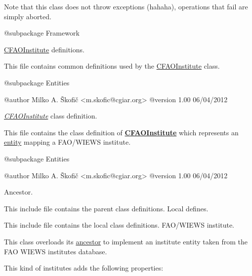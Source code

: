 Note that this class does not throw exceptions (hahaha), operations that fail are simply aborted.

\begin{DoxyVerb}    @subpackage     Framework\end{DoxyVerb}


\hyperlink{class_c_f_a_o_institute}{C\-F\-A\-O\-Institute} definitions.

This file contains common definitions used by the \hyperlink{class_c_f_a_o_institute}{C\-F\-A\-O\-Institute} class.

\begin{DoxyVerb}    @subpackage     Entities

    @author         Milko A. Škofič <m.skofic@cgiar.org>
    @version        1.00 06/04/2012\end{DoxyVerb}


{\itshape \hyperlink{class_c_f_a_o_institute}{C\-F\-A\-O\-Institute}} class definition.

This file contains the class definition of {\bfseries \hyperlink{class_c_f_a_o_institute}{C\-F\-A\-O\-Institute}} which represents an \hyperlink{class_c_entity}{entity} mapping a F\-A\-O/\-W\-I\-E\-W\-S institute.

\begin{DoxyVerb}    @subpackage     Entities

    @author         Milko A. Škofič <m.skofic@cgiar.org>
    @version        1.00 06/04/2012\end{DoxyVerb}


Ancestor.

This include file contains the parent class definitions. Local defines.

This include file contains the local class definitions. F\-A\-O/\-W\-I\-E\-W\-S institute.

This class overloads its \hyperlink{class_c_institute}{ancestor} to implement an institute entity taken from the F\-A\-O W\-I\-E\-W\-S institutes database.

This kind of institutes adds the following properties\-:


